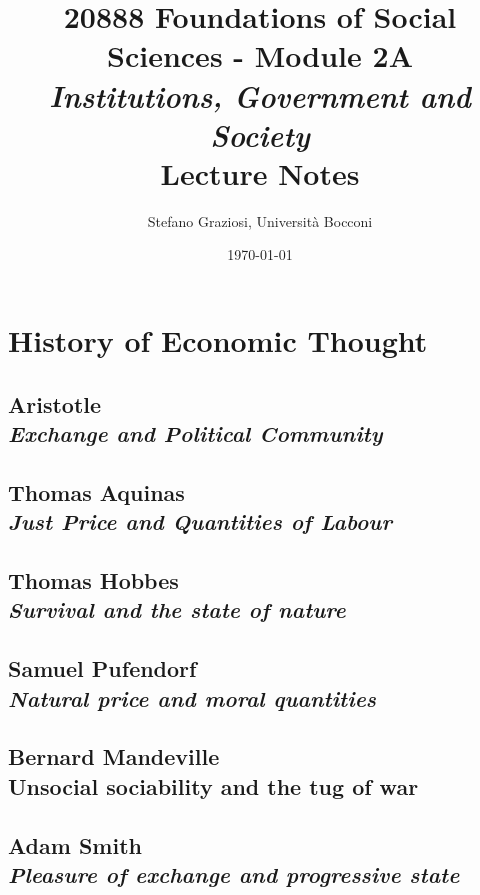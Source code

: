 \documentclass[dvipsnames,12pt]{book}
\title{20888 Foundations of Social Sciences - Module 2A \\[0.2cm] {\Large \textit{Institutions, Government and Society}} \\[1cm] \textbf{Lecture Notes}}
\author{Stefano Graziosi, Università Bocconi}
\date{\today}
\begin{document}
\maketitle

\tableofcontents

\part{History of Economic Thought}

    \chapter[Exchange and Political Community]{Aristotle \\[0.6cm] \textit{Exchange and Political Community}}

        

    \chapter[Just Price and Quantities of Labour]{Thomas Aquinas \\[0.6cm] \textit{Just Price and Quantities of Labour}}

        

    \chapter[Survival and the state of nature]{Thomas Hobbes \\[0.6cm] \textit{Survival and the state of nature}}

        

    \chapter[Natural price and moral quantities]{Samuel Pufendorf \\[0.6cm] \textit{Natural price and moral quantities}}

    \chapter[Unsocial sociability and the tug of war]{Bernard Mandeville \\[0.6cm] Unsocial sociability and the tug of war}

    \chapter[Pleasure of exchange and progressive state]{Adam Smith \\[0.6cm] \textit{Pleasure of exchange and progressive state}}
\end{document}
